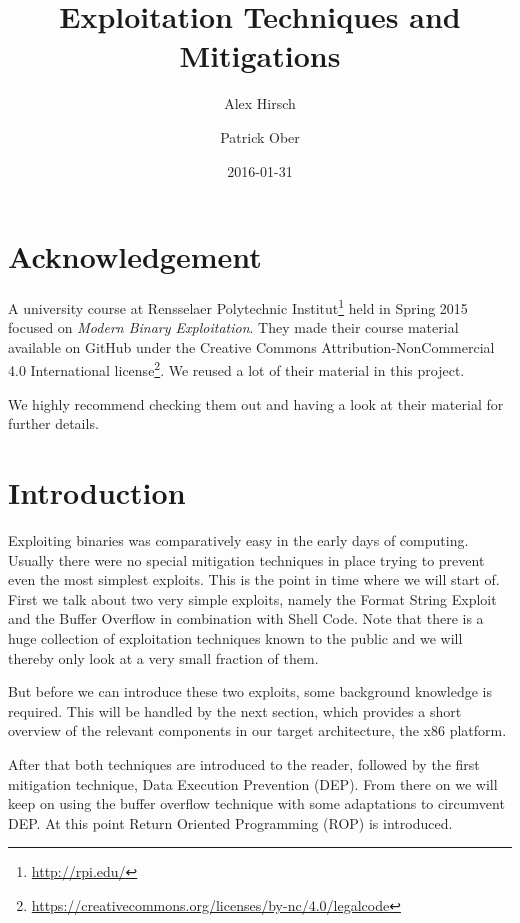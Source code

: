 \documentclass[article]{uibk}
\title{Exploitation Techniques and Mitigations}
\author{Alex Hirsch \and Patrick Ober}
\date{2016-01-31}
\begin{document}
\maketitle




\section*{Acknowledgement}

A university course at Rensselaer Polytechnic
Institut\footnote{\url{http://rpi.edu/}} held in Spring 2015 focused on
\textit{Modern Binary Exploitation}. They made their course material available
on GitHub \cite{RPISEC} under the Creative Commons Attribution-NonCommercial
4.0 International
license\footnote{\url{https://creativecommons.org/licenses/by-nc/4.0/legalcode}}.
We reused a lot of their material in this project.

We highly recommend checking them out and having a look at their material for
further details.

\section{Introduction}

Exploiting binaries was comparatively easy in the early days of computing.
Usually there were no special mitigation techniques in place trying to prevent
even the most simplest exploits. This is the point in time where we will start
of. First we talk about two very simple exploits, namely the Format String
Exploit and the Buffer Overflow in combination with Shell Code. Note that there
is a huge collection of exploitation techniques known to the public and we will
thereby only look at a very small fraction of them.

But before we can introduce these two exploits, some background knowledge is
required. This will be handled by the next section, which provides a short
overview of the relevant components in our target architecture, the x86
platform.

After that both techniques are introduced to the reader, followed by the first
mitigation technique, Data Execution Prevention (DEP). From there on we will
keep on using the buffer overflow technique with some adaptations to circumvent
DEP. At this point Return Oriented Programming (ROP) is introduced.
\end{document}
